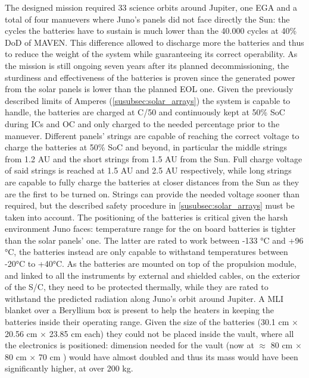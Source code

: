The designed mission required 33 science orbits around Jupiter, one EGA and a total of four manuevers where Juno's panels did not face directly the Sun: the cycles the batteries have to sustain is much lower than the 40.000 cycles at 40\% DoD of MAVEN. This difference allowed to discharge more the batteries and thus to reduce the weight of the system while guaranteeing its correct operability. As the mission is still ongoing seven years after its planned decommissioning, the sturdiness and effectiveness of the batteries is proven since the generated power from the solar panels is lower than the planned EOL one. Given the previously described limits of Amperes (\autoref{susubsec:solar_arrays}) the system is capable to handle, the batteries are charged at C/50 and continuously kept at 50\% SoC during ICs and OC and only charged to the needed percentage prior to the manuever. Different panels' strings are capable of reaching the correct voltage to charge the batteries at 50\% SoC and beyond, in particular the middle strings from 1.2 AU and the short strings from 1.5 AU from the Sun. Full charge voltage of said strings is reached at 1.5 AU and 2.5 AU respectively, while long strings are capable to fully charge the batteries at closer distances from the Sun as they are the first to be turned on. Strings can provide the needed voltage sooner than required, but the described safety procedure in \autoref{susubsec:solar_arrays} must be taken into account.\cite{solar_panels_coef} The positioning of the batteries is critical given the harsh environment Juno faces: temperature range for the on board batteries is tighter than the solar panels' one. The latter are rated to work between -133 °C and +96 °C, the batteries instead are only capable to withstand temperatures between -20°C to +40°C. As the batteries are mounted on top of the propulsion module, and linked to all the instruments by external and shielded cables, on the exterior of the S/C, they need to be protected thermally, while they are rated to withstand the predicted radiation along Juno's orbit around Jupiter.\cite{batteries_position} A MLI blanket over a Beryllium box is present to help the heaters in keeping the batteries inside their operating range. Given the size of the batteries (30.1 cm $\times$ 20.56 cm $\times$ 23.85 cm each) they could not be placed inside the vault, where all the electronics is positioned: dimension needed for the vault (now at  $\approx$ 80 cm $\times$ 80 cm $\times$ 70 cm ) would have almost doubled and thus its mass would have been significantly higher, at over 200 kg.\cite{batteries_position}

